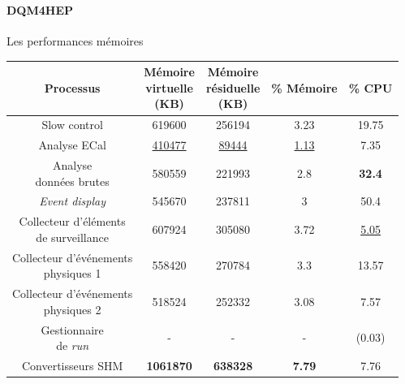 \documentclass[8pt]{beamer}
\begin{document}
  \begin{frame}
  \frametitle{\backup}
  \framesubtitle{DQM4HEP}
    \begin{block}{Les performances mémoires}
      \begin{table}[!h]
        \begin{center}
        \setlength\tabcolsep{10pt}
          \begin{tabular}{c|c|c|c|c}
            Processus & \makecell{Mémoire \\ virtuelle \\ (KB)} & \makecell{Mémoire \\ résiduelle \\ (KB)} & \% Mémoire & \% CPU \\
            \hline \hline
            Slow control & 619600 & 256194 & 3.23 & 19.75 \\
            \hline
            Analyse ECal & \underline{410477} & \underline{89444} & \underline{1.13} & 7.35 \\
            \hline
            \makecell{Analyse \\ données brutes} & 580559 & 221993 & 2.8 & \textbf{32.4} \\
            \hline
            \textit{Event display} & 545670 & 237811 & 3 & 50.4 \\
            \hline \hline
            \makecell{Collecteur d'éléments \\ de surveillance} & 607924 & 305080 & 3.72 & \underline{5.05} \\
            \hline
            \makecell{Collecteur d'événements \\ physiques 1} & 558420 & 270784 & 3.3 & 13.57 \\
            \hline
            \makecell{Collecteur d'événements \\ physiques 2} & 518524 & 252332 & 3.08 & 7.57 \\
            \hline
            \makecell{Gestionnaire \\ de \textit{run}} & - & - & - & (0.03) \\
            \hline \hline
            Convertisseurs SHM & \textbf{1061870} & \textbf{638328} & \textbf{7.79} & 7.76
          \end{tabular}
        \end{center}
      \end{table}
    \end{block}
  \end{frame}
\end{document}
